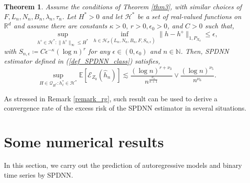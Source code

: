 \documentclass[10pt,twoside]{article}
\numberwithin{equation}{section}
\newtheorem{thm}{Theorem}[section]
\newcommand{\E}{\ensuremath{\mathbb{E}}}
\newcommand{\R}{\ensuremath{\mathbb{R}}}
\newcommand{\N}{\ensuremath{\mathbb{N}}}
\begin{document}
\begin{thm}\label{thm4}
Assume the conditions of Theorem \ref{thm3}, with similar choices of $F, L_n, N_n, B_n, \lambda_n, \tau_n$. 
%
Let $H^{*} > 0$ and let $\mathcal{H}^ {*} $ be a set of real-valued functions on $\R^d$  and assume there are constants $\kappa > 0, ~ r > 0, \epsilon_0 > 0$, and $C > 0$  such that, 
%
\begin{equation}\label{equ_assump_thm4}
\underset{ h^\diamond \in \mathcal{H}^ {*}: \|h^\diamond \|_{\infty} \leq H^ {*} }{\sup} ~\underset{ h \in  \mathcal{H}_\sigma (L_n, N_n, B_n, F, S_{n, \epsilon})}{\inf} \| h - h^\diamond \|_{1, P_{X_0}} \leq \epsilon,
\end{equation}
%
with $ S_ {n, \epsilon} \coloneqq C \epsilon^ {-\kappa} (\log n) ^r $ for any $ 
\epsilon \in  (0, \epsilon_0) $ and $ n \in  \N$. Then, SPDNN estimator defined in (\ref{def_SPDNN_class}) satisfies, 
%
\begin{equation}\label{bound_exces_risk}
\underset{H \in \mathcal{Q}_ {H^ {*}}: h_{\ell}^ {*} \in \mathcal{H}^ {*} }{\sup} \E \left[ \mathcal{E}_{Z_0} (\widehat{h}_n) \right] \lesssim \dfrac{ (\log n)^ {r + \nu_3} }{n^ { \frac{\nu_4}{\kappa + 1}  }}  \lor \dfrac{ (\log n) ^{\nu_5} }{n^{ \nu_6}}.
\end{equation}
   
\end{thm}
%
\noindent As stressed in Remark \ref{remark_rg}, such result can be used to derive a convergence rate of the excess risk of the SPDNN estimator in several situations.

\medskip


\section{Some numerical results}\label{some_sim}
%
In this section, we carry out the prediction of autoregressive models and binary time series by SPDNN.
%
\end{document}
